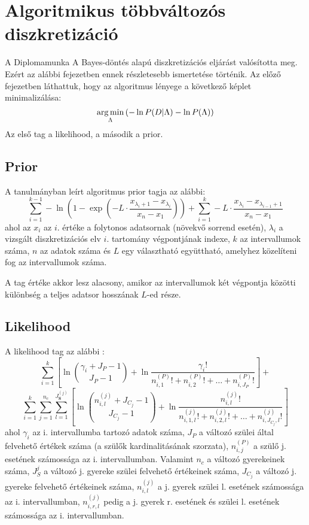 \chapter{Algoritmikus többváltozós diszkretizáció}
A Diplomamunka A Bayes-döntés alapú diszkretizációs eljárást valósította meg. Ezért az alábbi fejezetben ennek részletesebb ismertetése történik. Az előző fejezetben láthattuk, hogy az algoritmus lényege a következő képlet minimalizálása:
$$ \mathop{\mathrm{arg\,min}}_{\Lambda}{(-\ln{P(D | \Lambda)} - \ln{P(\Lambda)})}$$
Az első tag a likelihood, a második a prior.

\section{Prior}
A tanulmányban \cite{chen2017learning} leírt algoritmus prior tagja az alábbi:
$$\sum_{i=1}^{k-1} -\ln{(1-\exp{(
-L \cdot \frac{x_{\lambda_i+1}-x_{\lambda_i}}{x_{n}-x_{1}})})} +
\sum_{i=1}^{k}
-L \cdot \frac{x_{\lambda_i}-x_{\lambda_{i-1}+1}}{x_{n}-x_{1}}$$
ahol az $x_i$ az $i$. értéke a folytonos adatsornak (növekvő sorrend esetén), $\lambda_i$ a vizsgált diszkretizációs elv $i$. tartomány végpontjának indexe, $k$ az intervallumok száma, $n$ az adatok száma és $L$ egy választható együttható, amelyhez közelíteni fog az intervallumok száma.

A tag értéke akkor lesz alacsony, amikor az intervallumok két végpontja közötti különbség a teljes adatsor hosszának $L$-ed része.

\section{Likelihood}
A likelihood tag az alábbi \cite{boulle2006modl}:
$$
\sum_{i = 1}^{k} \left[ \ln \binom{\gamma_i+J_P-1}{J_P-1} + \ln \frac{\gamma_i!}{n_{i,1}^{(P)}! + n_{i,2}^{(P)}! + \dotsc + n_{i,J_P}^{(P)}!}\right] +
$$
$$
\sum_{i = 1}^{k}\sum_{j=1}^{n_c} \sum_{l=1}^{J_\textbf{S}^{(j)}} \left[ \ln \binom{n_{i,l}^{(j)}+J_{C_j}-1}{J_{C_j}-1} + \ln \frac{n_{i,l}^{(j)}!} {n_{i,1,l}^{(j)}! + n_{i,2,l}^{(j)}! + \dotsc + n_{i,J_{C_j},l}^{(j)}!}  \right]
$$
ahol $\gamma_i$ az i. intervallumba tartozó adatok száma, $J_P$ a változó szülei által felvehető értékek száma (a szülők kardinalitásának szorzata), $n_{i,j}^{(P)}$ a szülő j. esetének számossága az i. intervallumban.
Valamint $n_c$ a változó gyerekeinek száma, $J_S^{j}$ a változó j. gyereke szülei felvehető értékeinek száma, $J_{C_j}$ a változó j. gyereke felvehető értékeinek száma, $n_{i,l}^{(j)}$ a j. gyerek szülei l. esetének számossága az i. intervallumban, $n_{i,r,l}^{(j)}$ pedig a j. gyerek r. esetének és szülei l. esetének számossága az i. intervallumban.

